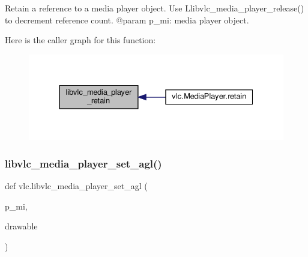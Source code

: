 \begin{DoxyVerb}Retain a reference to a media player object. Use
L{libvlc_media_player_release}() to decrement reference count.
@param p_mi: media player object.
\end{DoxyVerb}
 Here is the caller graph for this function\+:
\nopagebreak
\begin{figure}[H]
\begin{center}
\leavevmode
\includegraphics[width=331pt]{namespacevlc_aa0ba6b8fa96181ca59a4b12aa2b2ccde_icgraph}
\end{center}
\end{figure}
\mbox{\label{namespacevlc_a71a776d5201caa9efb0f154678044ce7}} 
\subsubsection{\texorpdfstring{libvlc\+\_\+media\+\_\+player\+\_\+set\+\_\+agl()}{libvlc\_media\_player\_set\_agl()}}
{\footnotesize\ttfamily def vlc.\+libvlc\+\_\+media\+\_\+player\+\_\+set\+\_\+agl (\begin{DoxyParamCaption}\item[{}]{p\+\_\+mi,  }\item[{}]{drawable }\end{DoxyParamCaption})}

